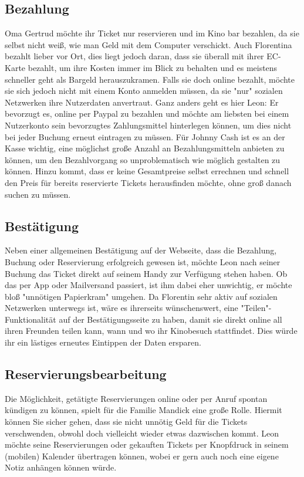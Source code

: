 \subsection{Bezahlung}
Oma Gertrud möchte ihr Ticket nur reservieren und im Kino bar bezahlen, da sie selbst nicht weiß, wie man Geld mit dem Computer verschickt. Auch Florentina bezahlt lieber vor Ort, dies liegt jedoch daran, dass sie überall mit ihrer EC-Karte bezahlt, um ihre Kosten immer im Blick zu behalten und es meistens schneller geht als Bargeld herauszukramen. Falls sie doch online bezahlt, möchte sie sich jedoch nicht mit einem Konto anmelden müssen, da sie "nur" sozialen Netzwerken ihre Nutzerdaten anvertraut. Ganz anders geht es hier Leon: Er bevorzugt es, online per Paypal zu bezahlen und möchte am liebsten bei einem Nutzerkonto sein bevorzugtes Zahlungsmittel hinterlegen können, um dies nicht bei jeder Buchung erneut eintragen zu müssen. Für Johnny Cash ist es an der Kasse wichtig, eine möglichst große Anzahl an Bezahlungsmitteln anbieten zu können, um den Bezahlvorgang so unproblematisch wie möglich gestalten zu können. Hinzu kommt, dass er keine Gesamtpreise selbst errechnen und schnell den Preis für bereits reservierte Tickets herausfinden möchte, ohne groß danach suchen zu müssen.

\subsection{Bestätigung}
Neben einer allgemeinen Bestätigung auf der Webseite, dass die Bezahlung, Buchung oder Reservierung erfolgreich gewesen ist, möchte Leon nach seiner Buchung das Ticket direkt auf seinem Handy zur Verfügung stehen haben. Ob das per App oder Mailversand passiert, ist ihm dabei eher unwichtig, er möchte bloß "unnötigen Papierkram" umgehen. Da Florentin sehr aktiv auf sozialen Netzwerken unterwegs ist, wäre es ihrerseits wünschenswert, eine "Teilen"-Funktionalität auf der Bestätigungsseite zu haben, damit sie direkt online all ihren Freunden teilen kann, wann und wo ihr Kinobesuch stattfindet. Dies würde ihr ein lästiges erneutes Eintippen der Daten ersparen.

\subsection{Reservierungsbearbeitung}
Die Möglichkeit, getätigte Reservierungen online oder per Anruf spontan kündigen zu können, spielt für die Familie Mandick eine große Rolle. Hiermit können Sie sicher gehen, dass sie nicht unnötig Geld für die Tickets verschwenden, obwohl doch vielleicht wieder etwas dazwischen kommt. Leon möchte seine Reservierungen oder gekauften Tickets per Knopfdruck in seinem (mobilen) Kalender übertragen können, wobei er gern auch noch eine eigene Notiz anhängen können würde. 

